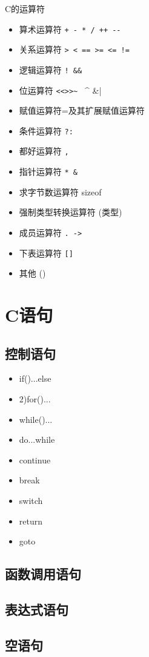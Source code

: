 \begin{lslisting}
\begin{enumerate}
C的运算符
\begin{itemize}
	\item 算术运算符	\verb |+ - * / ++ --|
	\item 关系运算符	\verb |> < == >= <= !=|
	\item 逻辑运算符 \verb |! && |
	\item 位运算符		\verb |<<>>~ | ^ &|
	\item 赋值运算符=及其扩展赋值运算符
	\item 条件运算符	\verb |?:|
	\item 都好运算符	\verb |,|
	\item 指针运算符	\verb |* &|
	\item 求字节数运算符	sizeof
	\item 强制类型转换运算符	(类型)
	\item 成员运算符	\verb |. ->|
	\item 下表运算符	\verb|[]|
	\item 其他  ()
\end{itemize}

\section{C语句}

\subsection{控制语句}
\begin{itemize}
	\item if()...else
	\item 2)for()...
	\item while()...
	\item do...while
	\item continue
	\item break
	\item switch
	\item return 
	\item goto
\end{itemize}
\subsection{函数调用语句}
\subsection{表达式语句}
\subsection{空语句}

\end{enumerate}
\end{lslisting}
